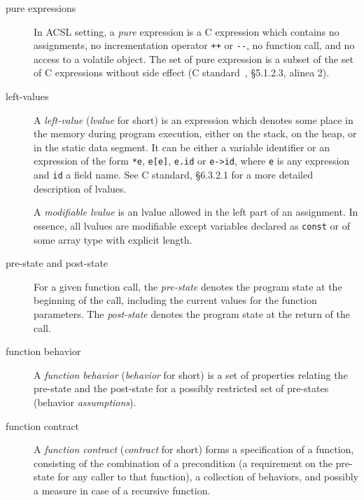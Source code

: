 \documentclass[a4paper,web]{frama-c-book}
\begin{document}
\begin{description}
\item[pure expressions]  In ACSL setting, a
  \emph{pure} expression is a C expression which contains no assignments, no
  incrementation operator \lstinline|++| or \lstinline|--|, no function call,
  and no access to a volatile object. The set of pure expression is a
  subset of the set of C expressions without side effect (C
  standard~\cite{KR88,standardc99}, \S 5.1.2.3, alinea 2).

\item[left-values] 

  A \emph{left-value} (\emph{lvalue} for short) is an expression which
  denotes some place in the memory during program execution, either on
  the stack, on the heap, or in the static data segment. It can be
  either a variable identifier or an expression of the form \lstinline|*e|,
  \lstinline|e[e]|, \lstinline|e.id| or \lstinline|e->id|, where
  \lstinline |e| is any expression and \lstinline|id| a field name.
  See C standard, \S 6.3.2.1 for a more
  detailed description of lvalues.

  A \emph{modifiable lvalue} is an lvalue allowed in the left part of
  an assignment. In essence, all lvalues are modifiable except
  variables declared as \texttt{const} or of some array type with
  explicit length.



\item[pre-state and post-state]

    For a given function call, the \emph{pre-state} denotes the
    program state at the beginning of the call, including the
    current values for the function parameters. The \emph{post-state}
    denotes the program state at the return of the call.

\item[function behavior]  

  A \emph{function behavior} (\emph{behavior} for short) is a set of
  properties relating the pre-state and the post-state for a
  possibly restricted set of pre-states (behavior \emph{assumptions}).

\item[function contract]  

  A \emph{function contract} (\emph{contract} for short) forms a
  specification of a function, consisting of the combination of a
  precondition (a requirement on the pre-state for any caller to that
  function), a collection of behaviors, and possibly a measure in case
  of a recursive function.

\end{description}
\end{document}
